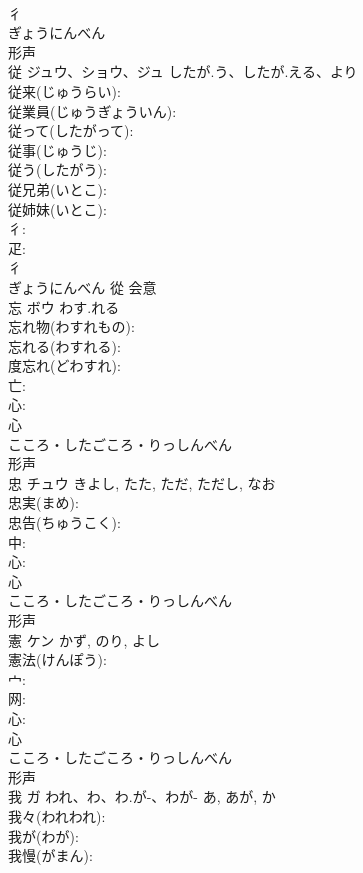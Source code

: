 \documentclass[8pt]{extreport}
\begin{document}
\begin{CJK}{UTF8}{min}
\\	彳	
\\	ぎょうにんべん	
\\	形声 
\\	従	ジュウ、ショウ、ジュ	したが.う、したが.える、より		
\\	従来(じゅうらい): 
\\	従業員(じゅうぎょういん): 
\\	従って(したがって): 
\\	従事(じゅうじ): 
\\	従う(したがう): 
\\	従兄弟(いとこ): 
\\	従姉妹(いとこ): 
\\	彳: 
\\	疋: 
\\	彳	
\\	ぎょうにんべん	從	会意 
\\	忘	ボウ	わす.れる		
\\	忘れ物(わすれもの): 
\\	忘れる(わすれる): 
\\	度忘れ(どわすれ): 
\\	亡: 
\\	心: 
\\	心	
\\	こころ・したごころ・りっしんべん	
\\	形声 
\\	忠	チュウ		きよし, たた, ただ, ただし, なお	
\\	忠実(まめ): 
\\	忠告(ちゅうこく): 
\\	中: 
\\	心: 
\\	心	
\\	こころ・したごころ・りっしんべん	
\\	形声 
\\	憲	ケン		かず, のり, よし	
\\	憲法(けんぽう): 
\\	宀: 
\\	网: 
\\	心: 
\\	心	
\\	こころ・したごころ・りっしんべん	
\\	形声 
\\	我	ガ	われ、わ、わ.が-、わが-	あ, あが, か	
\\	我々(われわれ): 
\\	我が(わが): 
\\	我慢(がまん): 

\end{CJK}
\end{document}
